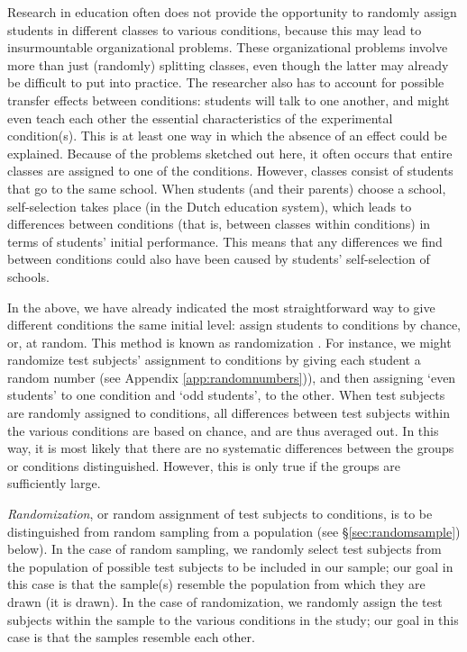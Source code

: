 \documentclass[
]{book}
\begin{document}
Research in education often does not provide the opportunity to randomly assign students in different classes to various conditions, because this may lead to insurmountable organizational problems. These organizational problems involve more than just (randomly) splitting classes, even though the latter may already be difficult to put into practice. The researcher also has to account for possible transfer effects between conditions: students will talk to one another, and might even teach each other the essential characteristics of the experimental condition(s). This is at least one way in which the absence of an effect could be explained. Because of the problems sketched out here, it often occurs that entire classes are assigned to one of the conditions. However, classes consist of students that go to the same school. When students (and their parents) choose a school, self-selection takes place (in the Dutch education system), which leads to differences between conditions (that is, between classes within conditions) in terms of students' initial performance. This means that any differences we find between conditions could also have been caused by students' self-selection of schools.

In the above, we have already indicated the most straightforward way to give different conditions the same initial level: assign students to conditions by chance, or, at random. This method is known as randomization \citep[p.294 ff]{SCC02}. For instance, we might randomize test subjects' assignment to conditions by giving each student a random number (see Appendix \ref{app:randomnumbers})), and then assigning `even students' to one condition and `odd students', to the other. When test subjects are randomly assigned to conditions, all differences between test subjects within the various conditions are based on chance, and are thus averaged out. In this way, it is most likely that there are no systematic differences between the groups or conditions distinguished. However, this is only true if the groups are sufficiently large.

\emph{Randomization}, or random assignment of test subjects to conditions, is to be distinguished from random sampling from a population (see §\ref{sec:randomsample}) below). In the case of random sampling, we randomly select test subjects from the population of possible test subjects to be included in our sample; our goal in this case is that the sample(s) resemble the population from which they are drawn (it is drawn). In the case of randomization, we randomly assign the test subjects within the sample to the various conditions in the study; our goal in this case is that the samples resemble each other.
\end{document}
